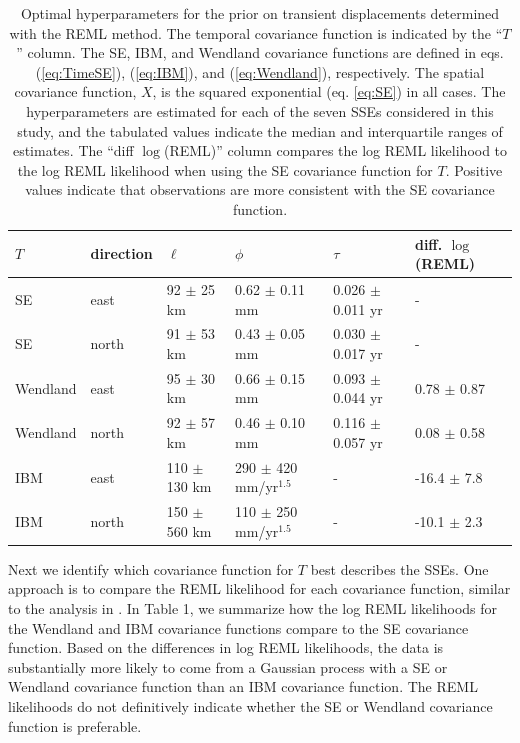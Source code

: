 \documentclass[10pt,letter]{article}
\begin{document}
\begin{table}\label{tab:Parameters}
\begin{tabular} {l l l l l l}
$T$ & direction & $\ell$  & $\phi$   & $\tau$  & diff. $\log$(REML) \\ \hline
SE & east   & 92 $\pm$ 25 km  & 0.62 $\pm$ 0.11 mm  & 0.026 $\pm$ 0.011 yr  &  - \\
SE & north  & 91 $\pm$ 53 km  & 0.43 $\pm$ 0.05 mm  & 0.030 $\pm$ 0.017 yr  &  - \\
Wendland & east   & 95 $\pm$ 30 km  & 0.66 $\pm$ 0.15 mm  & 0.093 $\pm$ 0.044 yr &  0.78 $\pm$ 0.87 \\
Wendland & north  & 92 $\pm$ 57 km  & 0.46 $\pm$ 0.10 mm  & 0.116 $\pm$ 0.057 yr &  0.08 $\pm$ 0.58 \\
IBM & east   & 110 $\pm$ 130 km & 290 $\pm$ 420 mm/yr$^{1.5}$  & -          & -16.4 $\pm$ 7.8 \\
IBM & north  & 150 $\pm$ 560 km & 110 $\pm$ 250 mm/yr$^{1.5}$ & -           & -10.1 $\pm$ 2.3 \\
\end{tabular}
\caption{Optimal hyperparameters for the prior on transient displacements determined with the REML method. The temporal covariance function is indicated by the ``$T$'' column. The SE, IBM, and Wendland covariance functions are defined in eqs. (\ref{eq:TimeSE}), (\ref{eq:IBM}), and (\ref{eq:Wendland}), respectively. The spatial covariance function, $X$, is the squared exponential (eq. \ref{eq:SE}) in all cases. The hyperparameters are estimated for each of the seven SSEs considered in this study, and the tabulated values indicate the median and interquartile ranges of estimates. The ``diff $\log$(REML)'' column compares the log REML likelihood to the log REML likelihood when using the SE covariance function for $T$. Positive values indicate that observations are more consistent with the SE covariance function.} 
\end{table}

Next we identify which covariance function for $T$ best describes the SSEs. One approach is to compare the REML likelihood for each covariance function, similar to the analysis in \citet{Langbein2004}. In Table 1, we summarize how the log REML likelihoods for the Wendland and IBM covariance functions compare to the SE covariance function.  Based on the differences in log REML likelihoods, the data is substantially more likely to come from a Gaussian process with a SE or Wendland covariance function than an IBM covariance function. The REML likelihoods do not definitively indicate whether the SE or Wendland covariance function is preferable. 
\end{document}
